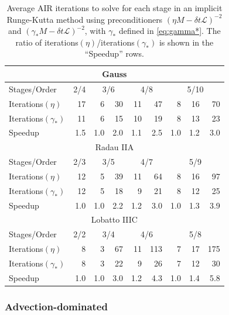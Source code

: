 \documentclass[review]{siamart}
\begin{document}
{
\renewcommand{\arraystretch}{1.15}
\begin{table}[!ht]
  \centering
  \begin{tabular}{|l || r | rr | rr | rrr |}  %
  \hline
\multicolumn{9}{|c|}{Gauss}\\\hline
Stages/Order & 2/4 & \multicolumn{2}{c}{3/6} & \multicolumn{2}{|c}{4/8} & \multicolumn{3}{|c|}{5/10} \\\hline
Iterations$(\eta)$ & 17 & 6 & 30 & 11  & 47 & 8 & 16 & 70 \\
Iterations$(\gamma_*)$ & 11 & 6 & 15 & 10 & 19 & 8 & 13 & 23 \\\hline
Speedup & 1.5 & 1.0 & 2.0 & 1.1 & 2.5 & 1.0 & 1.2 & 3.0 \\\hline\hline
\multicolumn{9}{|c|}{Radau IIA}\\\hline
Stages/Order & 2/3 & \multicolumn{2}{c}{3/5} & \multicolumn{2}{|c}{4/7} & \multicolumn{3}{|c|}{5/9} \\\hline
Iterations$(\eta)$ & 12 & 5 & 39 & 11 & 64 & 8 & 16 & 97 \\
Iterations$(\gamma_*)$ & 12 & 5 & 18 & 9 & 21 & 8 & 12 & 25 \\\hline
Speedup & 1.0 & 1.0 & 2.2 & 1.2 & 3.0 & 1.0 & 1.3 & 3.9 \\\hline\hline
\multicolumn{9}{|c|}{Lobatto IIIC}\\\hline
Stages/Order & 2/2 & \multicolumn{2}{c}{3/4} & \multicolumn{2}{|c}{4/6} & \multicolumn{3}{|c|}{5/8} \\\hline
Iterations$(\eta)$ & 8 & 3 & 67 & 11 & 113 & 7 & 17 & 175 \\
Iterations$(\gamma_*)$ & 8 & 3 & 22 & 9 & 26 & 7 & 12 & 30 \\\hline
Speedup & 1.0 & 1.0 & 3.0 & 1.2 & 4.3 & 1.0 & 1.4 & 5.8 \\\hline\hline
  \end{tabular}
  \caption{Average AIR iterations to solve for each stage in an implicit
  Runge-Kutta method using preconditioners $(\eta M - \delta t \mathcal{L})^{-2}$ and
  $(\gamma_* M - \delta t \mathcal{L})^{-2}$, with $\gamma_*$ defined in \eqref{eq:gamma*}. 
  The ratio of iterations$(\eta)$/iterations$(\gamma_*)$ is shown in the ``Speedup'' rows.}
  \label{tab:gamma}
\end{table}
}


\subsubsection{Advection-dominated}\label{sec:numerics:dg:adv}
\end{document}
